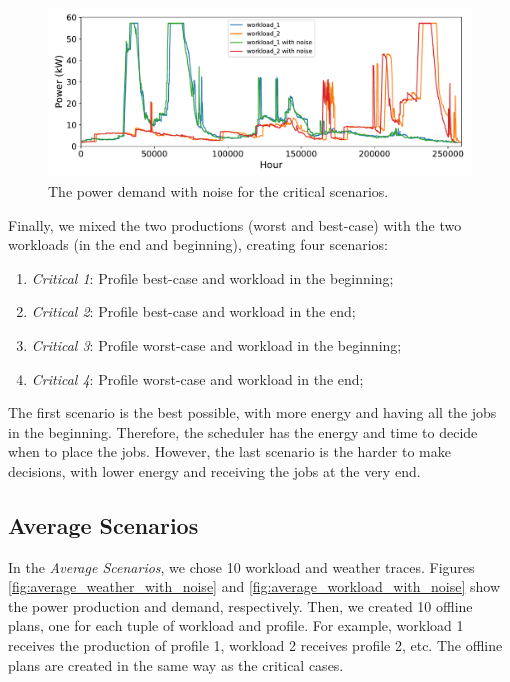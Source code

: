 \begin{figure}[!htb]
    \centering
    \includegraphics[scale=0.58]{Images/Compensations/critical_jobs_arriving_with_noise.pdf}
    \caption{The power demand with noise for the critical scenarios.}
    \label{fig:critical_workload_with_noise}
\end{figure}

Finally, we mixed the two productions (worst and best-case) with the two workloads (in the end and beginning), creating four scenarios:

\begin{enumerate}
    \item \emph{Critical 1}: Profile best-case and workload in the beginning;
    \item \emph{Critical 2}: Profile best-case and workload in the end;
    \item \emph{Critical 3}: Profile worst-case and workload in the beginning;
    \item \emph{Critical 4}: Profile worst-case and workload in the end;
\end{enumerate}

The first scenario is the best possible, with more energy and having all the jobs in the beginning. Therefore, the scheduler has the energy and time to decide when to place the jobs. However, the last scenario is the harder to make decisions, with lower energy and receiving the jobs at the very end.

\subsection{Average Scenarios}

In the \emph{Average Scenarios}, we chose 10 workload and weather traces. Figures \ref{fig:average_weather_with_noise} and \ref{fig:average_workload_with_noise} show the power production and demand, respectively. Then, we created 10 offline plans, one for each tuple of workload and profile. For example, workload 1 receives the production of profile 1, workload 2 receives profile 2, etc. The offline plans are created in the same way as the critical cases.

